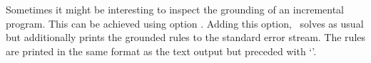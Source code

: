 Sometimes it might be interesting to inspect the grounding of an incremental program.
This can be achieved using option .
Adding this option, \clingo\ solves as usual
but additionally prints the grounded rules to the standard error stream.
The rules are printed in the same format as the text output but preceded with `\code{\%}'.

